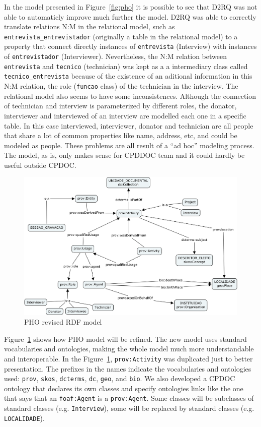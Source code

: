 In the model presented in Figure~\ref{fig:pho} it is possible to see
that D2RQ was not able to automaticly improve much further the
model. D2RQ was able to correctly translate relations N:M in the
relational model, such as \texttt{entrevista\_entrevistador}
(originally a table in the relational model) to a property that
connect directly instances of \texttt{entrevista} (Interview) with
instances of \texttt{entrevistador} (Interviewer). Nevertheless, the
N:M relation between \texttt{entrevista} and \texttt{tecnico}
(technician) was kept as a a intermediary class called
\texttt{tecnico\_entrevista} because of the existence of an aditional
information in this N:M relation, the role (\texttt{funcao} class) of
the technician in the interview. The relational model also seems to
have some inconsistences. Although the connection of technician and
interview is parameterized by different roles, the donator,
interviewer and interviewed of an interview are modelled each one in a
specific table. In this case interviewed, interviewer, donator and
technician are all people that share a lot of common properties like
name, address, etc, and could be modeled as people. These problems are
all result of a ``ad hoc'' modeling process. The model, as is, only
makes sense for CPDDOC team and it could hardly be useful outside
CPDOC.

\begin{figure}[htbp]
  \centering
  \includegraphics[width=.8\textwidth]{pho-new.png}
  \caption{PHO revised RDF model}\label{fig:pho-new}
\end{figure}

Figure~\ref{fig:pho-new} shows how PHO model will be refined. The new
model uses standard vocabularies and ontologies, making the whole
model much more understandable and interoperable. In the
Figure~\ref{fig:pho-new}, \texttt{prov:Activity} was duplicated just
to better presentation. The prefixes in the names indicate the
vocabularies and ontologies used: \texttt{prov}, \texttt{skos},
\texttt{dcterms}, \texttt{dc}, \texttt{geo}, and \texttt{bio}. We also
developed a CPDOC ontology that declares its own classes and specify
ontologies links like the one that says that an \texttt{foaf:Agent} is
a \texttt{prov:Agent}. Some classes will be subclasses of standard
classes (e.g. \texttt{Interview}), some will be replaced by standard
classes (e.g. \texttt{LOCALIDADE}). 

